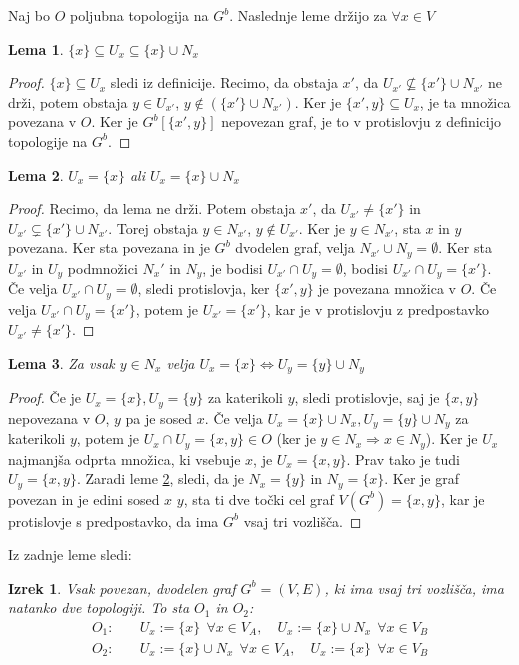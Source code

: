 \documentclass[a4paper, 12pt]{book}
\newtheorem{theorem}{Izrek}[section]
\newtheorem{lemma}{Lema}[section]
\theoremstyle{definition}
\begin{document}
Naj bo $O$ poljubna topologija na $G^b$. Naslednje leme držijo za $\forall x \in V$
\begin{lemma}\label{lem1}
  $\{x\} \subseteq U_x \subseteq \{x\} \cup N_x$
\end{lemma}
\begin{proof}
  $\{x\} \subseteq U_x$ sledi iz definicije. Recimo, da obstaja $x'$, da
  $U_{x'} \nsubseteq \{x'\} \cup N_{x'}$ ne drži, potem obstaja
  $y \in U_{x'}$, $y \notin (\{x'\} \cup N_{x'})$. Ker je $\{x', y\} \subseteq U_x$,
  je ta množica povezana v $O$. Ker je $G^b[\{x',y\}]$ nepovezan graf, je to v
  protislovju z definicijo topologije na $G^b$.
\end{proof}
\begin{lemma}\label{lem2}
  $U_x = \{x\}$ ali $U_x = \{x\} \cup N_x$
\end{lemma}
\begin{proof}
  Recimo, da lema ne drži. Potem obstaja $x'$, da $U_{x'} \neq \{x'\}$ in
  $U_{x'} \subsetneq \{x'\} \cup N_{x'}$. Torej obstaja $y \in N_{x'}$, $y \notin U_{x'}$.
  Ker je $y \in N_{x'}$, sta $x$ in $y$ povezana. Ker sta povezana in je $G^b$
  dvodelen graf, velja $N_{x'} \cup N_y = \emptyset$. Ker sta $U_{x'}$ in $U_y$ 
  podmnožici $N_x'$ in $N_y$, je bodisi $U_{x'} \cap U_y = \emptyset$,
  bodisi $U_{x'} \cap U_y = \{x'\}$. Če velja $U_{x'} \cap U_y = \emptyset$, sledi
  protislovja, ker $\{x',y\}$ je povezana množica v $O$.
  Če velja $U_{x'} \cap U_y = \{x'\}$, potem je $U_{x'} = \{x'\}$, kar je v
  protislovju z predpostavko $U_{x'} \neq \{x'\}$.
\end{proof}
\begin{lemma}\label{lem3}
  Za vsak $y \in N_x$ velja $U_x = \{x\} \iff U_y = \{y\} \cup N_y$
\end{lemma}
\begin{proof}
Če je $U_x = \{x\}, U_y = \{y\}$ za katerikoli $y$, sledi protislovje, saj je 
$\{x,y\}$ nepovezana v $O$, $y$ pa je sosed $x$.
Če velja $U_x = \{x\} \cup N_x, U_y = \{y\} \cup N_y$ za katerikoli $y$, potem je
$U_x \cap U_y = \{x, y\} \in O$ (ker je $y \in N_x \Rightarrow x \in N_y$). Ker je
$U_x$ najmanjša odprta množica, ki vsebuje $x$, je $U_x = \{x,y\}$. Prav tako je
tudi $U_y = \{x,y\}$. Zaradi leme \ref*{lem2}, sledi, da je $N_x = \{y\}$ in $N_y = \{x\}$.
Ker je graf povezan in je edini sosed $x$ $y$, sta ti dve točki cel graf
$V(G^b) = \{x,y\}$, kar je protislovje s predpostavko, da ima $G^b$ vsaj tri vozlišča.
\end{proof}

Iz zadnje leme sledi:
\begin{theorem}
Vsak povezan, dvodelen graf $G^b = (V,E)$, ki ima vsaj tri vozlišča, ima natanko
dve topologiji. To sta $O_1$ in $O_2$:
\[
  \begin{split}
  O_1:&\quad
  U_x:=\{x\}\ \ \forall x \in V_A, \quad
  U_x:=\{x\}\cup N_x\ \  \forall x \in V_B\\
  O_2:&\quad
  U_x:=\{x\}\cup N_x\ \  \forall x \in V_A, \quad
  U_x:=\{x\}\ \ \forall x \in V_B\\
\end{split}
\]
\end{theorem}
\end{document}
